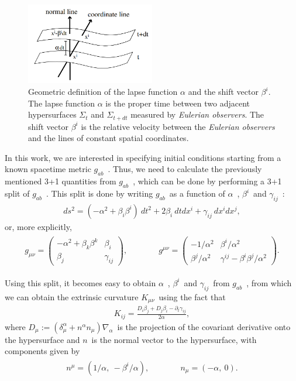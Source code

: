 \begin{figure}[h]
\centering
\includegraphics[width=0.5\textwidth]{Figures/Definitions_of_the_3+1_quantities.png}
\caption{Geometric definition of the lapse function $\alpha$ and the shift vector $\beta^i$. The lapse function $\alpha$ is the proper time between two adjacent hypersurfaces $\Sigma_t$ and $\Sigma_{t+dt}$ measured by \textit{Eulerian observers}. The shift vector $\beta^i$ is the relative velocity between the \textit{Eulerian observers} and the lines of constant spatial coordinates.}
\end{figure}

In this work, we are interested in specifying initial conditions starting from a known spacetime metric $g_{ab}$~. Thus, we need to calculate the previously mentioned 3+1 quantities from $g_{ab}$~, which can be done by performing a 3+1 split of $g_{ab}$~. This split is done by writing $g_{ab}$~as a function of $\alpha$~, $\beta^i$~and $\gamma_{ij}$~:
%
\begin{align}
    ds^2 = (-\alpha^2 + \beta_i \beta^i) ~ dt^2 + 2 \beta_i ~ dt dx^i + \gamma_{ij} ~ dx^i dx^j,
\end{align}
%
or, more explicitly,
%
\begin{align}
    \begin{aligned}
        g_{\mu\nu} = \begin{pmatrix} -\alpha^2 + \beta_k \beta^k & \beta_i \\ \beta_j & \gamma_{ij} \end{pmatrix}, & \quad \quad \quad g^{\mu\nu} = \begin{pmatrix} -1/\alpha^2 & \beta^i/\alpha^2 \\ \beta^j/\alpha^2 & \gamma^{ij} - \beta^i \beta^j/\alpha^2\end{pmatrix}.
    \end{aligned}
\end{align}

Using this split, it becomes easy to obtain $\alpha$~, $\beta^i$~and $\gamma_{ij}$~from $g_{ab}$~, from which we can obtain the extrinsic curvature $K_{\mu\nu}$~using the fact that
%
\begin{align}
    K_{ij} = \frac{D_i \beta_j + D_j \beta_i - \partial_t \gamma_{ij}}{2 \alpha},
\end{align}
%
where $D_\mu := (\delta^\alpha_\mu + n^\alpha n_\mu) \nabla_\alpha$~is the projection of the covariant derivative onto the hypersurface and $n$~is the normal vector to the hypersurface, with components given by
%
\begin{align}
    \begin{aligned}
        n^\mu = (1/\alpha,~-\beta^i/\alpha), & \quad \quad \quad n_\mu = (-\alpha,~0).
    \end{aligned}
\end{align}


